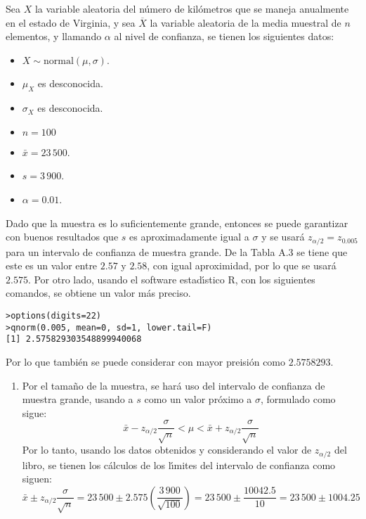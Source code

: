 \begin{solucion}
 Sea $X$ la variable aleatoria del n\'umero de kil\'ometros que se maneja anualmente en el estado de Virginia, y sea $\overline{X}$ la variable aleatoria de la media muestral de $n$ elementos, y llamando $\alpha$ al nivel de confianza, se tienen los siguientes datos:
 \begin{itemize}
  \item $X\sim\text{normal}(\mu,\sigma)$.
  \item $\mu_X$ es desconocida.
  \item $\sigma_X$ es desconocida.
  \item $n=100$
  \item $\bar{x} = 23\,500$.
  \item $s=3\,900$.
  \item $\alpha=0.01$.
 \end{itemize}
 Dado que la muestra es lo suficientemente grande, entonces se puede garantizar con buenos resultados que $s$ es aproximadamente igual a $\sigma$ y se usar\'a $z_{\alpha/2} = z_{0.005}$ para un intervalo de confianza de muestra grande. De la Tabla A.3 se tiene que este es un valor entre $2.57$ y $2.58$, con igual aproximidad, por lo que se usar\'a $2.575$. Por otro lado, usando el software estad\'{\i}stico R, con los siguientes comandos, se obtiene un valor m\'as preciso.
 \begin{verbatim}
>options(digits=22)
>qnorm(0.005, mean=0, sd=1, lower.tail=F)
[1] 2.575829303548899940068
 \end{verbatim}
 \vspace{-0.5cm}
 Por lo que tambi\'en se puede considerar con mayor preisi\'on como $2.5758293$.
 \begin{enumerate}
  \item Por el tama\~no de la muestra, se har\'a uso del intervalo de confianza de muestra grande, usando a $s$ como un valor pr\'oximo a $\sigma$, formulado como sigue:
  \begin{equation*}
   \bar{x}-z_{\alpha/2}\frac{\sigma}{\sqrt{n}} < \mu < \bar{x}+z_{\alpha/2}\frac{\sigma}{\sqrt{n}}
  \end{equation*}
  Por lo tanto, usando los datos obtenidos y considerando el valor de $z_{\alpha/2}$ del libro, se tienen los c\'alculos de los l\'{\i}mites del intervalo de confianza como siguen:
  \begin{equation*}
   \bar{x}\pm z_{\alpha/2}\frac{\sigma}{\sqrt{n}} = 23\,500\pm 2.575\left( \frac{3\,900}{\sqrt{100}} \right) = 23\,500 \pm \frac{10042.5}{10} = 23\,500\pm 1004.25

\end{equation*}
\end{enumerate}
\end{solucion}
